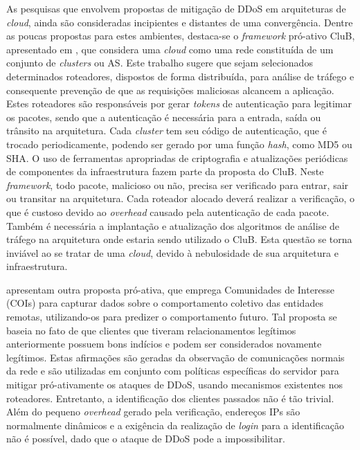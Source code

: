 As pesquisas que envolvem propostas de mitigação de DDoS em arquiteturas de \emph{cloud}, ainda são consideradas incipientes e distantes de uma convergência. Dentre as poucas propostas para estes ambientes, destaca-se o \emph{framework} pró-ativo CluB, apresentado em \cite{Hazelhurst:2008:SCU:1456659.1456671}, que considera uma \emph{cloud} como uma rede constituída de um conjunto de \emph{clusters} ou AS. Este trabalho sugere
que sejam selecionados determinados roteadores, dispostos de forma distribuída, para análise de tráfego e consequente prevenção de que as requisições maliciosas alcancem a aplicação. Estes roteadores são responsáveis por gerar \emph{tokens} de autenticação para legitimar os pacotes, sendo que a autenticação é necessária para a entrada, saída ou trânsito na arquitetura. Cada \emph{cluster} tem seu código de autenticação, que é trocado periodicamente, podendo ser gerado por uma função \emph{hash}, como MD5 ou SHA. O uso de ferramentas apropriadas de criptografia e atualizações periódicas de componentes da infraestrutura fazem parte da proposta do CluB. Neste \emph{framework}, todo pacote, malicioso ou não, precisa ser verificado para entrar, sair ou transitar na arquitetura. Cada roteador alocado  deverá realizar a verificação, o que é custoso devido ao \emph{overhead} causado pela autenticação de cada pacote. Também é necessária a implantação e atualização dos algoritmos de análise de tráfego na arquitetura onde estaria sendo utilizado o CluB. Esta questão se torna inviável ao se tratar de uma \emph{cloud}, devido à nebulosidade de sua arquitetura e infraestrutura.

\cite{Verkaik:2006:PCD:1162666.1162673} apresentam outra proposta pró-ativa, que emprega Comunidades de Interesse (COIs) para capturar dados sobre o comportamento coletivo das entidades remotas, utilizando-os para predizer o comportamento futuro. Tal proposta se baseia no fato de que clientes que tiveram relacionamentos legítimos anteriormente possuem bons indícios e podem ser considerados novamente legítimos. Estas afirmações são geradas da observação de comunicações normais da rede e são utilizadas em conjunto com políticas específicas do servidor para mitigar pró-ativamente os ataques de DDoS, usando mecanismos existentes nos roteadores. 
%
Entretanto, a identificação dos clientes passados não é tão trivial. Além do pequeno \emph{overhead} gerado pela verificação, endereços IPs são normalmente dinâmicos e a exigência da realização de \emph{login} para a identificação não é possível, dado que o ataque de DDoS pode a impossibilitar.


